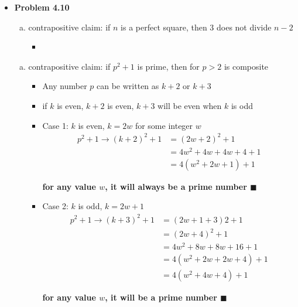 \documentclass{article}
\begin{document}
\begin{itemize}
        \item \textbf{Problem 4.10}
        \begin{enumerate}[(k)]
            \item contrapositive claim: if $n$ is a perfect square, then 3 does not divide $n-2$
            \begin{itemize}
                \item 
            \end{itemize}
        \end{enumerate}
        \begin{enumerate}[(l)]
            \item contrapositive claim: if $p^2+1$ is prime, then for $p > 2$ is composite
            \begin{itemize}
                \item Any number $p$ can be written as $k+2$ or $k+3$
                \item if $k$ is even, $k + 2$ is even, $k+3$ will be even when $k$ is odd
                \item Case 1: $k$ is even, $k = 2w$ for some integer $w$
                \begin{align*}
                    p^2 + 1 \rightarrow (k+2)^2 + 1 &= (2w+2)^2 + 1\\
                    &=4w^2 + 4w + 4w + 4 + 1\\
                    &=4(w^2 + 2w + 1) + 1
                \end{align*}
                \begin{center}
                    \textbf{for any value $w$, it will always be a prime number $\blacksquare$}
                \end{center}
                \item Case 2: $k$ is odd, $k = 2w + 1$
                \begin{align*}
                    p^2 + 1 \rightarrow (k+3)^2 + 1 &= (2w+1+3)2 + 1\\
                    &=(2w+4)^2 + 1\\
                    &=4w^2 + 8w + 8w + 16 + 1\\
                    &=4(w^2 + 2w + 2w + 4) + 1\\
                    &=4(w^2 + 4w + 4) + 1
                \end{align*}
                \begin{center}
                    \textbf{for any value $w$, it will be a prime number $\blacksquare$}
                \end{center}
            \end{itemize}
        \end{enumerate}
        

\end{itemize}
\end{document}
